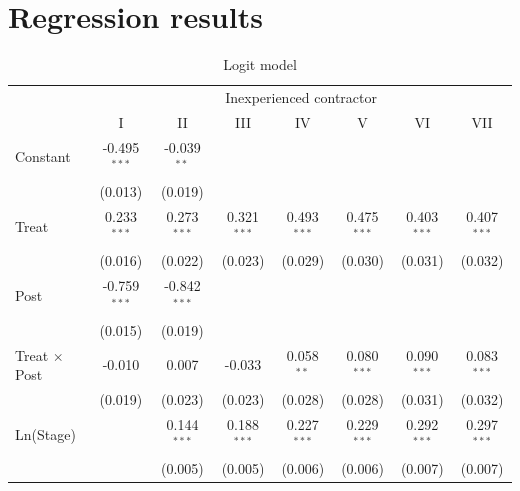\documentclass[
]{article}
\begin{document}
\hypertarget{regression-results}{%
\section{Regression results}\label{regression-results}}

\begin{table}[htbp]
   \caption{Logit model}
   \centering
   \small
   \begin{tabular}{lccccccc}
      \toprule
       & \multicolumn{7}{c}{Inexperienced contractor}\\
                                          & I              & II             & III           & IV            & V             & VI            & VII\\  
      Constant                            & -0.495$^{***}$ & -0.039$^{**}$  &               &               &               &               &   \\   
                                          & (0.013)        & (0.019)        &               &               &               &               &   \\   
      Treat                               & 0.233$^{***}$  & 0.273$^{***}$  & 0.321$^{***}$ & 0.493$^{***}$ & 0.475$^{***}$ & 0.403$^{***}$ & 0.407$^{***}$\\   
                                          & (0.016)        & (0.022)        & (0.023)       & (0.029)       & (0.030)       & (0.031)       & (0.032)\\   
      Post                                & -0.759$^{***}$ & -0.842$^{***}$ &               &               &               &               &   \\   
                                          & (0.015)        & (0.019)        &               &               &               &               &   \\   
      Treat $\times$ Post                 & -0.010         & 0.007          & -0.033        & 0.058$^{**}$  & 0.080$^{***}$ & 0.090$^{***}$ & 0.083$^{***}$\\   
                                          & (0.019)        & (0.023)        & (0.023)       & (0.028)       & (0.028)       & (0.031)       & (0.032)\\   
      Ln(Stage)                           &                & 0.144$^{***}$  & 0.188$^{***}$ & 0.227$^{***}$ & 0.229$^{***}$ & 0.292$^{***}$ & 0.297$^{***}$\\   
                                          &                & (0.005)        & (0.005)       & (0.006)       & (0.006)       & (0.007)       & (0.007)\\   

\end{tabular}
\end{table}
\end{document}
